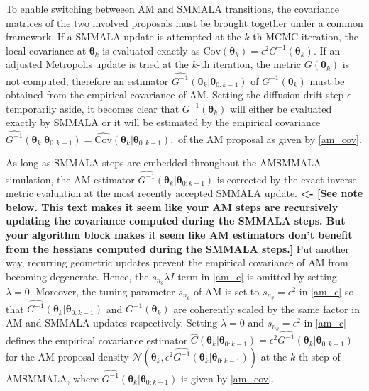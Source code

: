 \documentclass[twoside,11pt]{article}
\begin{document}
{To enable switching betweeen AM and SMMALA transitions, the covariance matrices of the two involved proposals must be brought
together under a common framework. If a SMMALA update is attempted at the $k$-th MCMC iteration, the local covariance at
$\boldsymbol{\theta}_k$ is evaluated exactly as
$\mbox{Cov}(\boldsymbol{\theta}_{k})=\epsilon^2 G^{-1}(\boldsymbol{\theta}_{k})$. If an adjusted Metropolis update is 
tried at the $k$-th iteration, the metric $G(\boldsymbol{\theta}_{k})$ is not computed, therefore an estimator
$\widehat{G^{-1}}(\boldsymbol{\theta}_{k}|\boldsymbol{\theta}_{0:k-1})$ of $G^{-1}(\boldsymbol{\theta}_{k})$ must be 
obtained from the empirical covariance of AM. Setting the diffusion drift step $\epsilon$ temporarily aside, it becomes 
clear that $G^{-1}(\boldsymbol{\theta}_{k})$ will either be evaluated exactly by SMMALA or it will be estimated by the 
empirical covariance
$
\widehat{G^{-1}}(\boldsymbol{\theta}_{k}|\boldsymbol{\theta}_{0:k-1})=
\widehat{\mbox{Cov}}(\boldsymbol{\theta}_{k}|\boldsymbol{\theta}_{0:k-1}),
$
of the AM proposal as given by \eqref{am_cov}.

As long as SMMALA steps are embedded throughout the AMSMMALA simulation, the AM estimator
$\widehat{G^{-1}}(\boldsymbol{\theta}_{k}|\boldsymbol{\theta}_{0:k-1})$ is corrected by the exact inverse metric evaluation 
at the most recently accepted SMMALA update. 
{\bf <- [See note below.  This text makes it seem like your AM steps are recursively updating the covariance computed during the SMMALA steps.  But your algorithm block makes it seem like AM estimators don't benefit from the hessians computed during the SMMALA steps.] }  
Put another way, recurring geometric updates prevent the empirical covariance of
AM from becoming degenerate. Hence, the $s_{n_{\theta}}\lambda I$ term in \eqref{am_c} is omitted by setting $\lambda=0$.
Moreover, the tuning parameter $s_{n_{\theta}}$ of AM is set to $s_{n_{\theta}}=\epsilon^2$ in \eqref{am_c} so that
$\widehat{G^{-1}}(\boldsymbol{\theta}_{k}|\boldsymbol{\theta}_{0:k-1})$ and $G^{-1}(\boldsymbol{\theta}_k)$ are coherently
scaled by the same factor in AM and SMMALA updates respectively. Setting $\lambda=0$ and $s_{n_{\theta}}=\epsilon^2$ in
\eqref{am_c} defines the empirical covariance estimator
$\hat{C}(\boldsymbol{\theta}_{k}|\boldsymbol{\theta}_{0:k-1})=
\epsilon^2\widehat{G^{-1}}(\boldsymbol{\theta}_{k}|\boldsymbol{\theta}_{0:k-1})$
for the AM proposal density
$\mathcal{N}(\boldsymbol{\theta}_{k}, \epsilon^2\widehat{G^{-1}}(\boldsymbol{\theta}_{k}|\boldsymbol{\theta}_{0:k-1}))$
at the $k$-th step of AMSMMALA, where $\widehat{G^{-1}}(\boldsymbol{\theta}_{k}|\boldsymbol{\theta}_{0:k-1})$ is given by 
\eqref{am_cov}.

}
\end{document}
